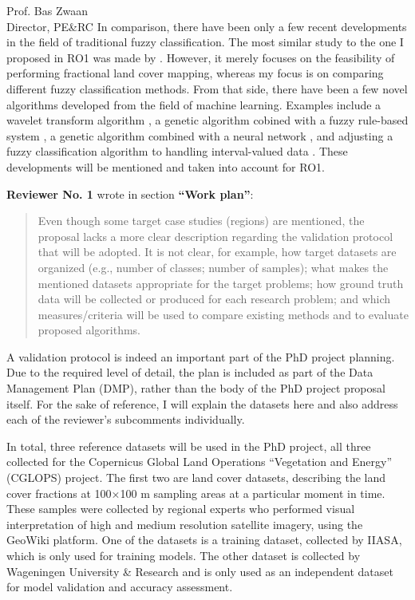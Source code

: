 \documentclass[a4paper,10pt,backaddress=false]{scrartcl}
\begin{document}
\begin{letter}{Prof. Bas Zwaan \\ Director, PE\&RC}
In comparison, there have been only a few recent developments in the field of traditional fuzzy classification. The most similar study to the one I proposed in RO1 was made by \citet{colditz_land_2011}. However, it merely focuses on the feasibility of performing fractional land cover mapping, whereas my focus is on comparing different fuzzy classification methods. From that side, there have been a few novel algorithms developed from the field of machine learning. Examples include a wavelet transform algorithm \citep{uma_shankar_wavelet-fuzzy_2011}, a genetic algorithm cobined with a fuzzy rule-based system \citep{stavrakoudis_boosted_2011}, a genetic algorithm combined with a neural network \citep{chatterjee_forest_2016}, and adjusting a fuzzy classification algorithm to handling interval-valued data \citep{yu_land_2014}. These developments will be mentioned and taken into account for RO1.

\bigskip

\textbf{Reviewer No. 1} wrote in section \textbf{``Work plan''}:

\blockquote{Even though some target case studies (regions) are mentioned, the proposal lacks a more clear description regarding the validation protocol that will be adopted. It is not clear, for example, how target datasets are organized (e.g., number of classes; number of samples); what makes the mentioned datasets appropriate for the target problems; how ground truth data will be collected or produced for each research problem; and which measures/criteria will be used to compare existing methods and to evaluate proposed algorithms.}

A validation protocol is indeed an important part of the PhD project planning. Due to the required level of detail, the plan is included as part of the Data Management Plan (DMP), rather than the body of the PhD project proposal itself. For the sake of reference, I will explain the datasets here and also address each of the reviewer's subcomments individually.

In total, three reference datasets will be used in the PhD project, all three collected for the Copernicus Global Land Operations ``Vegetation and Energy'' (CGLOPS) project. The first two are land cover datasets, describing the land cover fractions at 100×100 m sampling areas at a particular moment in time. These samples were collected by regional experts who performed visual interpretation of high and medium resolution satellite imagery, using the GeoWiki platform. One of the datasets is a training dataset, collected by IIASA, which is only used for training models. The other dataset is collected by Wageningen University \& Research and is only used as an independent dataset for model validation and accuracy assessment.


\end{letter}
\end{document}
